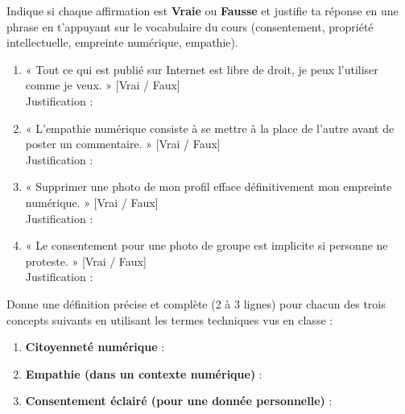 \documentclass[11pt]{article}
\begin{document}
\begin{exercice}
Indique si chaque affirmation est \textbf{Vraie} ou \textbf{Fausse} et justifie ta réponse en une phrase en t'appuyant sur le vocabulaire du cours (consentement, propriété intellectuelle, empreinte numérique, empathie).

\begin{enumerate}
\item « Tout ce qui est publié sur Internet est libre de droit, je peux l'utiliser comme je veux. » \hfill [Vrai / Faux] \\
Justification : \dotfill
\item « L'empathie numérique consiste à se mettre à la place de l'autre avant de poster un commentaire. » \hfill [Vrai / Faux] \\
Justification : \dotfill
\item « Supprimer une photo de mon profil efface définitivement mon empreinte numérique. » \hfill [Vrai / Faux] \\
Justification : \dotfill
\item « Le consentement pour une photo de groupe est implicite si personne ne proteste. » \hfill [Vrai / Faux] \\
Justification : \dotfill
\end{enumerate}
\end{exercice}

\begin{exercice}
Donne une définition précise et complète (2 à 3 lignes) pour chacun des trois concepts suivants en utilisant les termes techniques vus en classe :

\begin{enumerate}
\item \textbf{Citoyenneté numérique} : \dotfill \dotfill \dotfill
\item \textbf{Empathie (dans un contexte numérique)} : \dotfill \dotfill \dotfill
\item \textbf{Consentement éclairé (pour une donnée personnelle)} : \dotfill \dotfill \dotfill
\end{enumerate}
\end{exercice}
\end{document}
